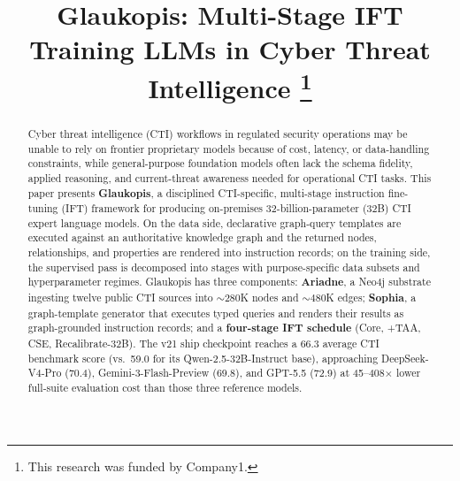\documentclass[conference]{IEEEtran}
\begin{document}
\title{Glaukopis: Multi-Stage IFT Training LLMs in Cyber Threat Intelligence
\thanks{This research was funded by Company1.}
}

\author{%
%
}

\maketitle

\begin{abstract}
Cyber threat intelligence (CTI) workflows in regulated security operations may be unable to rely on frontier proprietary models because of cost, latency, or data-handling constraints, while general-purpose foundation models often lack the schema fidelity, applied reasoning, and current-threat awareness needed for operational CTI tasks. This paper presents \textbf{Glaukopis}, a disciplined CTI-specific, multi-stage instruction fine-tuning (IFT) framework for producing on-premises 32-billion-parameter (32B) CTI expert language models. On the data side, declarative graph-query templates are executed against an authoritative knowledge graph and the returned nodes, relationships, and properties are rendered into instruction records; on the training side, the supervised pass is decomposed into stages with purpose-specific data subsets and hyperparameter regimes. Glaukopis has three components: \textbf{Ariadne}, a Neo4j substrate ingesting twelve public CTI sources into ${\sim}280$K nodes and ${\sim}480$K edges; \textbf{Sophia}, a graph-template generator that executes typed queries and renders their results as graph-grounded instruction records; and a \textbf{four-stage IFT schedule} (Core, +TAA, CSE, Recalibrate-32B). The v21 ship checkpoint reaches a 66.3 average CTI benchmark score (vs.\ 59.0 for its Qwen-2.5-32B-Instruct base), approaching DeepSeek-V4-Pro (70.4), Gemini-3-Flash-Preview (69.8), and GPT-5.5 (72.9) at 45--408$\times$ lower full-suite evaluation cost than those three reference models.
\end{abstract}
\end{document}
